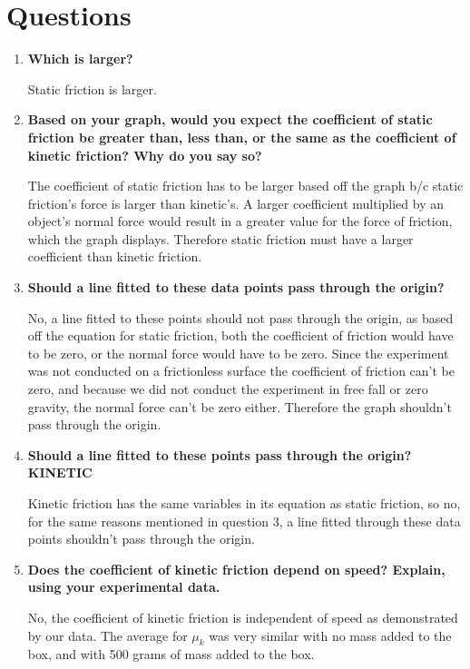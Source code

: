 
 \section{Questions}

\vspace{-0.5cm}
\singlespacing

\begin{enumerate}
	\item \textbf{Which is larger?}

	Static friction is larger.	

	\item \textbf{Based on your graph, would you expect the coefficient of static friction be greater than, less than, or the same as the coefficient of kinetic friction? Why do you say so?}

	The coefficient of static friction has to be larger based off the graph b/c static friction's force is larger than kinetic's. A larger coefficient multiplied by an object's normal force would result in a greater value for the force of friction, which the graph displays. Therefore static friction must have a larger coefficient than kinetic friction.	

\item \textbf{Should a line fitted to these data points pass through the origin?}

No, a line fitted to these points should not pass through the origin, as based off the equation for static friction, both the coefficient of friction would have to be zero, or the normal force would have to be zero. Since the experiment was not conducted on a frictionless surface the coefficient of friction can't be zero, and because we did not conduct the experiment in free fall or zero gravity, the normal force can't be zero either. Therefore the graph shouldn't pass through the origin. 

\item \textbf{Should a line fitted to these points pass through the origin? KINETIC}

Kinetic friction has the same variables in its equation as static friction, so no, for the same reasons mentioned in question 3, a line fitted through these data points shouldn't pass through the origin. 

\item \textbf{Does the coefficient of kinetic friction depend on speed? Explain, using your experimental data.}
	
No, the coefficient of kinetic friction is independent of speed as demonstrated by our data. The average for $\mu_k$ was very similar with no mass added to the box, and with 500 grams of mass added to the box.


\end{enumerate}
